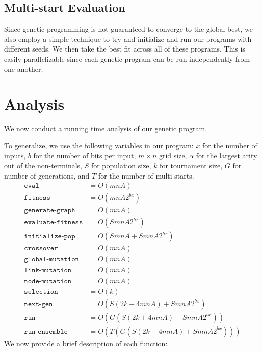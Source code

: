 \documentclass{article}
\begin{document}
	\subsection{Multi-start Evaluation}
	Since genetic programming is not guaranteed to converge to the global best, we also employ a simple technique to try and initialize and run our programs with different seeds. We then take the best fit across all of these programs. This is easily parallelizable since each genetic program can be run independently from one another. 
	
	\section{Analysis}
	We now conduct a running time analysis of our genetic program.
	
	To generalize, we use the following variables in our program: $x$ for the number of inputs, $b$ for the number of bits per input, $m\times n$ grid size, $\alpha$ for the largest arity out of the non-terminals, $S$ for population size, $k$ for tournament size, $G$ for number of generations, and $T$ for the number of multi-starts.
	\begin{align*}
	\texttt{eval} &= O(mnA) \\
	\texttt{fitness} &= O(mnA2^{bx})\\
	\texttt{generate-graph} &= O(mnA)\\
	\texttt{evaluate-fitness} &= O(SmnA2^{bx})\\
	\texttt{initialize-pop} &= O(SmnA + SmnA2^{bx})\\
	\texttt{crossover} &= O(mnA)\\
	\texttt{global-mutation} &= O(mnA)\\
	\texttt{link-mutation} &= O(mnA)\\
	\texttt{node-mutation} &= O(mnA)\\
	\texttt{selection} &= O(k) \\
	\texttt{next-gen} &= O(S(2k + 4mnA) + SmnA2^{bx}) \\
	\texttt{run} &= O(G(S(2k + 4mnA) + SmnA2^{bx})) \\
	\texttt{run-ensemble} &= O(T(G(S(2k + 4mnA) + SmnA2^{bx})))
	\end{align*}
	We now provide a brief description of each function:
\end{document}

